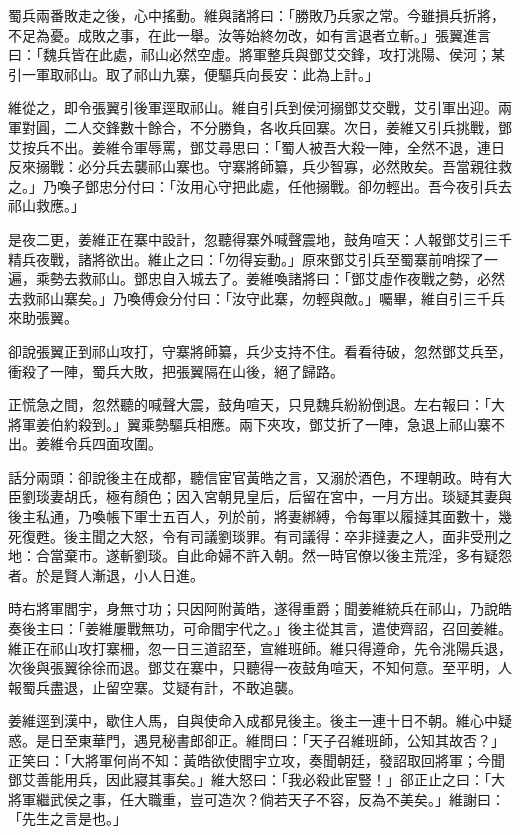 蜀兵兩番敗走之後，心中搖動。維與諸將曰：「勝敗乃兵家之常。今雖損兵折將，不足為憂。成敗之事，在此一舉。汝等始終勿改，如有言退者立斬。」張翼進言曰：「魏兵皆在此處，祁山必然空虛。將軍整兵與鄧艾交鋒，攻打洮陽、侯河；某引一軍取祁山。取了祁山九寨，便驅兵向長安：此為上計。」

維從之，即令張翼引後軍逕取祁山。維自引兵到侯河搦鄧艾交戰，艾引軍出迎。兩軍對圓，二人交鋒數十餘合，不分勝負，各收兵回寨。次日，姜維又引兵挑戰，鄧艾按兵不出。姜維令軍辱罵，鄧艾尋思曰：「蜀人被吾大殺一陣，全然不退，連日反來搦戰：必分兵去襲祁山寨也。守寨將師纂，兵少智寡，必然敗矣。吾當親往救之。」乃喚子鄧忠分付曰：「汝用心守把此處，任他搦戰。卻勿輕出。吾今夜引兵去祁山救應。」

是夜二更，姜維正在寨中設計，忽聽得寨外喊聲震地，鼓角喧天：人報鄧艾引三千精兵夜戰，諸將欲出。維止之曰：「勿得妄動。」原來鄧艾引兵至蜀寨前哨探了一遍，乘勢去救祁山。鄧忠自入城去了。姜維喚諸將曰：「鄧艾虛作夜戰之勢，必然去救祁山寨矣。」乃喚傅僉分付曰：「汝守此寨，勿輕與敵。」囑畢，維自引三千兵來助張翼。

卻說張翼正到祁山攻打，守寨將師纂，兵少支持不住。看看待破，忽然鄧艾兵至，衝殺了一陣，蜀兵大敗，把張翼隔在山後，絕了歸路。

正慌急之間，忽然聽的喊聲大震，鼓角喧天，只見魏兵紛紛倒退。左右報曰：「大將軍姜伯約殺到。」翼乘勢驅兵相應。兩下夾攻，鄧艾折了一陣，急退上祁山寨不出。姜維令兵四面攻圍。

話分兩頭：卻說後主在成都，聽信宦官黃皓之言，又溺於酒色，不理朝政。時有大臣劉琰妻胡氏，極有顏色；因入宮朝見皇后，后留在宮中，一月方出。琰疑其妻與後主私通，乃喚帳下軍士五百人，列於前，將妻綁縛，令每軍以履撻其面數十，幾死復甦。後主聞之大怒，令有司議劉琰罪。有司議得：卒非撻妻之人，面非受刑之地：合當棄市。遂斬劉琰。自此命婦不許入朝。然一時官僚以後主荒淫，多有疑怨者。於是賢人漸退，小人日進。

時右將軍閻宇，身無寸功；只因阿附黃皓，遂得重爵；聞姜維統兵在祁山，乃說皓奏後主曰：「姜維屢戰無功，可命閻宇代之。」後主從其言，遣使齊詔，召回姜維。維正在祁山攻打寨柵，忽一日三道詔至，宣維班師。維只得遵命，先令洮陽兵退，次後與張翼徐徐而退。鄧艾在寨中，只聽得一夜鼓角喧天，不知何意。至平明，人報蜀兵盡退，止留空寨。艾疑有計，不敢追襲。

姜維逕到漢中，歇住人馬，自與使命入成都見後主。後主一連十日不朝。維心中疑惑。是日至東華門，遇見秘書郎卻正。維問曰：「天子召維班師，公知其故否？」正笑曰：「大將軍何尚不知：黃皓欲使閻宇立攻，奏聞朝廷，發詔取回將軍；今聞鄧艾善能用兵，因此寢其事矣。」維大怒曰：「我必殺此宦豎！」郤正止之曰：「大將軍繼武侯之事，任大職重，豈可造次？倘若天子不容，反為不美矣。」維謝曰：「先生之言是也。」

